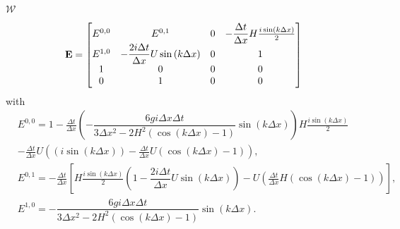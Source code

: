 $\mathcal{W}$

\begin{equation}
\mathbf{E} = \begin{bmatrix}
{E}^{0,0} & {E}^{0,1} & 0 & - \dfrac{\Delta t}{\Delta x}H\frac{i\sin\left(k\Delta x\right)}{2} \\
{E}^{1,0} & -\dfrac{2i \Delta t }{\Delta x} U \sin\left(k \Delta x\right)&0 & 1 \\
1&0&0&0\\
0&1&0&0
\end{bmatrix}
\end{equation}
with
\begin{align*}
&{E}^{0,0} = 1 - \frac{\Delta t}{\Delta x}\left(-\dfrac{6 gi \Delta x\Delta t}{3 \Delta x^2 -2{H^2} \left( \cos\left(k \Delta x\right) - 1 \right)}{ \sin\left(k \Delta x\right)}\right)H\frac{i\sin\left(k\Delta x\right)}{2} \\ &- \frac{\Delta t}{\Delta x}U\left(\left(i\sin\left(k\Delta x\right)\right) - \frac{\Delta t}{\Delta x}U\left(\cos\left(k\Delta x\right) - 1\right)\right), \\
&{E}^{0,1} = - \frac{\Delta t}{\Delta x} \left[H\frac{i\sin\left(k\Delta x\right)}{2}\left( 1 -\dfrac{2i \Delta t }{\Delta x} U \sin\left(k \Delta x\right) \right)   -U\left(\frac{\Delta t}{\Delta x}H\left(\cos\left(k\Delta x\right) - 1\right)\right) \right],\\
& {E}^{1,0} =-\dfrac{6 gi \Delta x\Delta t}{3 \Delta x^2 -2{H^2} \left( \cos\left(k \Delta x\right) - 1 \right)}{ \sin\left(k \Delta x\right)}.
\end{align*}